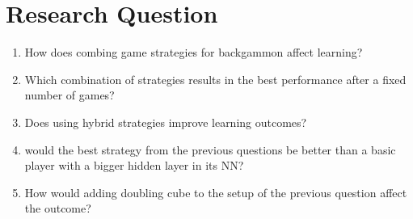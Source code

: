 \chapter{Research Question}
\begin{enumerate}
\item How does combing game strategies for backgammon affect learning? 
\item Which combination of strategies results in the best performance after a fixed number of games?
\item Does using hybrid strategies improve learning outcomes?
\item would the best strategy from the previous questions be better than a basic player with a bigger hidden layer in its NN?
\item How would adding doubling cube to the setup of the previous question affect the outcome?
\end{enumerate}